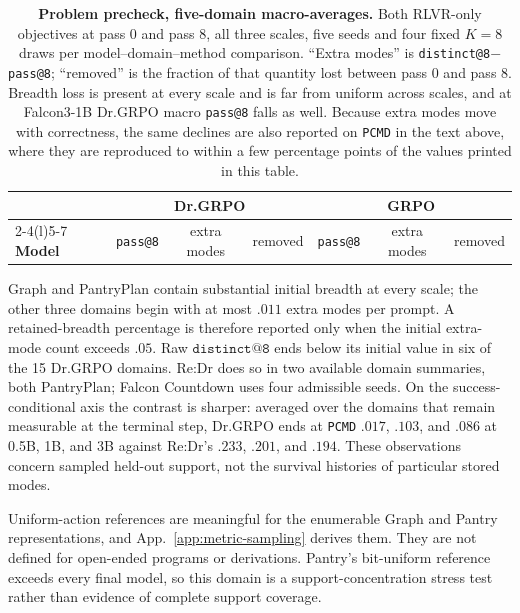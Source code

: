 \documentclass{article}
\makeatletter
\newcommand{\1}{\mathbf 1}
\newcommand{\pmd}{\texttt{PCMD}}
\newcommand{\distk}{\texttt{distinct@8}}
\theoremstyle{remark}
\theoremstyle{definition}
\theoremstyle{plain}
\makeatother
\begin{document}
\begin{table}[h]
  \centering
  \caption{\textbf{Problem precheck, five-domain macro-averages.} Both
  RLVR-only objectives at pass 0 and pass 8, all three scales, five seeds
  and four fixed $K=8$ draws per model--domain--method comparison. ``Extra modes'' is
  \distk{}$-$\texttt{pass@8}; ``removed'' is the fraction of that
  quantity lost between pass 0 and pass 8. Breadth loss is present at every
  scale and is far from uniform across scales, and at Falcon3-1B Dr.GRPO
  macro \texttt{pass@8} falls as well. Because extra modes move with
  correctness, the same declines are also reported on \pmd{} in the text above,
  where they are reproduced to within a few percentage points of the values
  printed in this table.}
  \label{tab:baseline-collapse-precheck}
  \small
  \setlength{\tabcolsep}{4.5pt}
  \begin{tabular}{@{}l*{6}{c}@{}}
    \toprule
    & \multicolumn{3}{c}{\textbf{Dr.GRPO}} & \multicolumn{3}{c}{\textbf{GRPO}} \\
    \cmidrule(lr){2-4}\cmidrule(l){5-7}
    \textbf{Model} & \texttt{pass@8} & extra modes & removed
                   & \texttt{pass@8} & extra modes & removed \\
    \midrule
    
  \end{tabular}
\end{table}


Graph and PantryPlan contain substantial initial breadth at every scale;
the other three domains begin with at most $.011$ extra modes per prompt.
A retained-breadth percentage is therefore reported only when the initial
extra-mode count exceeds $.05$. Raw $\texttt{distinct@8}$ ends below its
initial value in six of the 15 Dr.GRPO domains. Re:Dr does so in
two available domain summaries, both PantryPlan; Falcon Countdown uses
four admissible seeds. On the success-conditional axis the contrast is
sharper: averaged over the domains that remain measurable at the terminal
step, Dr.GRPO ends at \pmd{} $.017$, $.103$, and $.086$ at 0.5B, 1B, and 3B
against Re:Dr's $.233$, $.201$, and $.194$. These observations concern
sampled held-out support, not the survival histories of particular stored
modes.

Uniform-action references are meaningful for the enumerable Graph and
Pantry representations, and App.~\ref{app:metric-sampling} derives them. They
are not defined for open-ended programs or derivations. Pantry's bit-uniform reference exceeds every final model, so
this domain is a support-concentration stress test rather than evidence
of complete support coverage.
\end{document}
